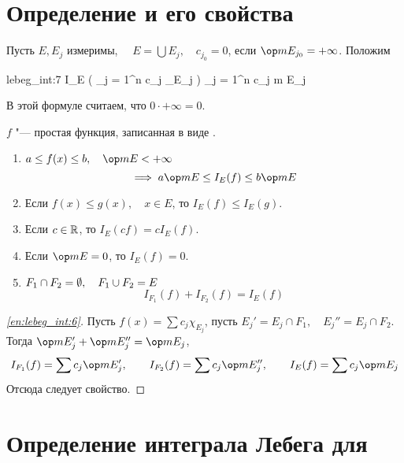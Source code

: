 \section{Определение  и его свойства}

\begin{definition}
	Пусть $ E, E_j $ измеримы, $ \quad E = \bigcup E_j, \quad c_{j_0} = 0 $, если $ \op m E_{j_0} = +\infty $.
	Положим
	\begin{equ}{lebeg_int:7}
		I_E \Bigl( \sum_{j = 1}^n c_j \chi_{E_j} \Bigr) \coloneq \sum_{j = 1}^n c_j \op m E_j
	\end{equ}
	В этой формуле считаем, что $ 0 \cdot +\infty = 0 $.
\end{definition}

\begin{properties}
	$ f $ "--- простая функция, записанная в виде .
	\begin{enumerate}
		\item $ a \le f(x) \le b, \quad \op m E < +\infty $
			$$ \implies a \op m E \le I_E(f) \le b \op m E $$

		\item Если $ f(x) \le g(x), \quad x \in E $, то $ I_E(f) \le I_E(g) $.

		\item Если $ c \in \mathbb{R} $, то $ I_E(cf) = cI_E(f) $.

		\item \label{en:lebeg_int:4} Если $ \op m E = 0 $, то $ I_E(f) = 0 $.

		\item \label{en:lebeg_int:6} $ F_1 \cap F_2 = \emptyset, \quad F_1 \cup F_2 = E $
			$$ I_{F_1}(f) + I_{F_2}(f) = I_E(f) $$
	\end{enumerate}
\end{properties}

\begin{proof}[\ref{en:lebeg_int:6}]
	Пусть $ f(x) = \sum c_j \chi_{E_j} $, пусть $ E_j' = E_j \cap F_1, \quad E_j'' = E_j \cap F_2 $. \\
	Тогда $ \op m E_j' + \op m E_j'' = \op m E_j $,
	$$ I_{F_1}(f) = \sum c_j \op m E_j', \qquad I_{F_2}(f) = \sum c_j \op m E_j'', \qquad I_E(f) = \sum c_j \op m E_j $$
	Отсюда следует свойство.
\end{proof}

\section{Определение интеграла Лебега для }

